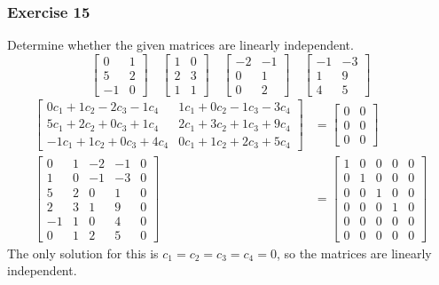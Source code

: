 \documentclass{math}
\begin{document}
\subsubsection*{Exercise 15}
Determine whether the given matrices are linearly independent.
\[ \begin{bmatrix} 0 & 1 \\ 5 & 2 \\ -1 & 0\end{bmatrix} \quad
  \begin{bmatrix}1 & 0 \\ 2 & 3 \\ 1 & 1\end{bmatrix} \quad
  \begin{bmatrix}-2 & -1 \\ 0 & 1 \\ 0 & 2\end{bmatrix} \quad
  \begin{bmatrix}-1 & -3 \\ 1 & 9 \\ 4 & 5\end{bmatrix} \]
\begin{align*}
  \begin{bmatrix}
    0c_1+1c_2-2c_3-1c_4 & 1c_1+0c_2-1c_3-3c_4 \\
    5c_1+2c_2+0c_3+1c_4 & 2c_1+3c_2+1c_3+9c_4 \\
    -1c_1+1c_2+0c_3+4c_4 & 0c_1+1c_2+2c_3+5c_4
  \end{bmatrix} &= \begin{bmatrix}
    0 & 0 \\
    0 & 0 \\
    0 & 0
  \end{bmatrix} \\
  \begin{bmatrix}
    0 & 1 & -2 & -1 & 0 \\
    1 & 0 & -1 & -3 & 0 \\
    5 & 2 & 0 & 1 & 0 \\
    2 & 3 & 1 & 9 & 0 \\
    -1 & 1 & 0 & 4 & 0 \\
    0 & 1 & 2 & 5 & 0
  \end{bmatrix} &= \begin{bmatrix}
    1 & 0 & 0 & 0 & 0 \\
    0 & 1 & 0 & 0 & 0 \\
    0 & 0 & 1 & 0 & 0 \\
    0 & 0 & 0 & 1 & 0 \\
    0 & 0 & 0 & 0 & 0 \\
    0 & 0 & 0 & 0 & 0
  \end{bmatrix}
\end{align*}
The only solution for this is \( c_1 = c_2 = c_3 = c_4 = 0 \), so the matrices
are linearly independent.
\end{document}
